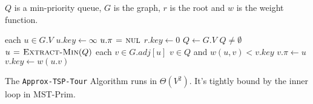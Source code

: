 $Q$ is a min-priority queue, $G$ is the graph, $r$ is the root and $w$ is the
weight function.
\begin{codebox}
\li \For each $u \in G.V$ \Do
\li   $u.key \gets \infty$
\li   $u.\pi \mathrel{\hspace{1pt}=\hspace{1pt}} \textnormal{\scshape nul}$ \End
\li $r.key \gets 0$
\li $Q \gets G.V$
\li \While $Q \neq \emptyset$ \Do
\li   $u \mathrel{\hspace{1pt}=\hspace{1pt}} \textnormal{\scshape Extract-Min}(Q)$
\li   \For each $v \in G.adj[u]$ \Do
\li     \If $v \in Q$ and $w(u,v) < v.key$ \Do
\li       $v.\pi \gets u$
\li       $v.key \gets w(u.v)$
\end{codebox}

The \texttt{Approx-TSP-Tour} Algorithm runs in $\Theta(V^2)$. It's tightly bound
by the inner loop in MST-Prim.


